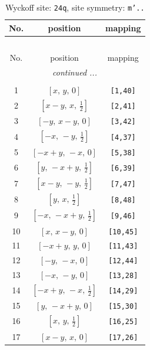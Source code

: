\documentclass[fleqn,8pt]{jsarticle}
\begin{document}
\begin{longtable}{ccc}
\caption{Wyckoff site: {\tt 24q}, site symmetry: {\tt m'..}}
 \\
 \hline \hline
No. & position & mapping \\ \hline \endfirsthead

\multicolumn{2}{l}{\tablename\ \thetable{}} \\
 \hline \hline
No. & position & mapping \\ \hline \endhead

 \hline \hline
\multicolumn{2}{r}{\footnotesize\it continued ...} \\ \endfoot

 \hline \hline
\multicolumn{2}{r}{} \\ \endlastfoot

1 & $\left[ x,\, y,\, 0 \right]$ & {\tt [1,40]} \\ \hline
2 & $\left[ x - y,\, x,\, \frac{1}{2} \right]$ & {\tt [2,41]} \\ \hline
3 & $\left[ - y,\, x - y,\, 0 \right]$ & {\tt [3,42]} \\ \hline
4 & $\left[ - x,\, - y,\, \frac{1}{2} \right]$ & {\tt [4,37]} \\ \hline
5 & $\left[ - x + y,\, - x,\, 0 \right]$ & {\tt [5,38]} \\ \hline
6 & $\left[ y,\, - x + y,\, \frac{1}{2} \right]$ & {\tt [6,39]} \\ \hline
7 & $\left[ x - y,\, - y,\, \frac{1}{2} \right]$ & {\tt [7,47]} \\ \hline
8 & $\left[ y,\, x,\, \frac{1}{2} \right]$ & {\tt [8,48]} \\ \hline
9 & $\left[ - x,\, - x + y,\, \frac{1}{2} \right]$ & {\tt [9,46]} \\ \hline
10 & $\left[ x,\, x - y,\, 0 \right]$ & {\tt [10,45]} \\ \hline
11 & $\left[ - x + y,\, y,\, 0 \right]$ & {\tt [11,43]} \\ \hline
12 & $\left[ - y,\, - x,\, 0 \right]$ & {\tt [12,44]} \\ \hline
13 & $\left[ - x,\, - y,\, 0 \right]$ & {\tt [13,28]} \\ \hline
14 & $\left[ - x + y,\, - x,\, \frac{1}{2} \right]$ & {\tt [14,29]} \\ \hline
15 & $\left[ y,\, - x + y,\, 0 \right]$ & {\tt [15,30]} \\ \hline
16 & $\left[ x,\, y,\, \frac{1}{2} \right]$ & {\tt [16,25]} \\ \hline
17 & $\left[ x - y,\, x,\, 0 \right]$ & {\tt [17,26]} \\ \hline

\end{longtable}
\end{document}
